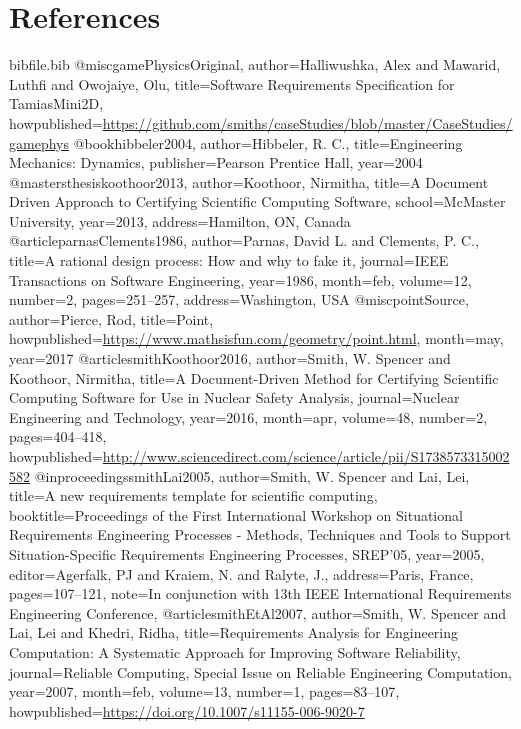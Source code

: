 \documentclass[12pt]{article}
\begin{document}
\section{References}
\label{Sec:References}
\begin{filecontents*}{bibfile.bib}
@misc{gamePhysicsOriginal,
author={Halliwushka, Alex and Mawarid, Luthfi and Owojaiye, Olu},
title={Software Requirements Specification for TamiasMini2D},
howpublished={\url{https://github.com/smiths/caseStudies/blob/master/CaseStudies/gamephys}}}
@book{hibbeler2004,
author={Hibbeler, R. C.},
title={Engineering Mechanics: Dynamics},
publisher={Pearson Prentice Hall},
year={2004}}
@mastersthesis{koothoor2013,
author={Koothoor, Nirmitha},
title={A Document Driven Approach to Certifying Scientific Computing Software},
school={McMaster University},
year={2013},
address={Hamilton, ON, Canada}}
@article{parnasClements1986,
author={Parnas, David L. and Clements, P. C.},
title={A rational design process: How and why to fake it},
journal={IEEE Transactions on Software Engineering},
year={1986},
month=feb,
volume={12},
number={2},
pages={251--257},
address={Washington, USA}}
@misc{pointSource,
author={Pierce, Rod},
title={Point},
howpublished={\url{https://www.mathsisfun.com/geometry/point.html}},
month=may,
year={2017}}
@article{smithKoothoor2016,
author={Smith, W. Spencer and Koothoor, Nirmitha},
title={A Document-Driven Method for Certifying Scientific Computing Software for Use in Nuclear Safety Analysis},
journal={Nuclear Engineering and Technology},
year={2016},
month=apr,
volume={48},
number={2},
pages={404--418},
howpublished={\url{http://www.sciencedirect.com/science/article/pii/S1738573315002582}}}
@inproceedings{smithLai2005,
author={Smith, W. Spencer and Lai, Lei},
title={A new requirements template for scientific computing},
booktitle={Proceedings of the First International Workshop on Situational Requirements Engineering Processes - Methods, Techniques and Tools to Support Situation-Specific Requirements Engineering Processes, SREP'05},
year={2005},
editor={Agerfalk, PJ and Kraiem, N. and Ralyte, J.},
address={Paris, France},
pages={107--121},
note={In conjunction with 13th IEEE International Requirements Engineering Conference,}}
@article{smithEtAl2007,
author={Smith, W. Spencer and Lai, Lei and Khedri, Ridha},
title={Requirements Analysis for Engineering Computation: A Systematic Approach for Improving Software Reliability},
journal={Reliable Computing, Special Issue on Reliable Engineering Computation},
year={2007},
month=feb,
volume={13},
number={1},
pages={83--107},
howpublished={\url{https://doi.org/10.1007/s11155-006-9020-7}}}

\end{filecontents*}
\end{document}
